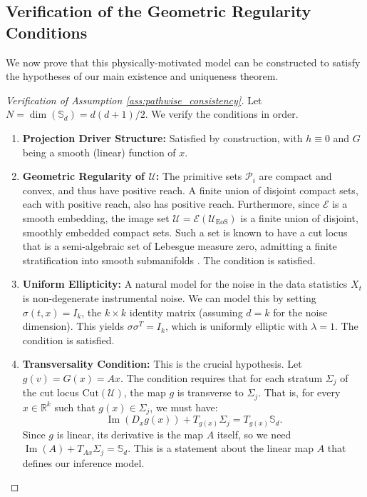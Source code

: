\documentclass[12pt, letterpaper]{amsart}
\newcommand{\Ucal}{\mathcal{U}}
\DeclareMathOperator{\Image}{Im}
\newcommand{\Sd}{\mathbb{S}_d}
\newcommand{\R}{\mathbb{R}}
\theoremstyle{plain}
\theoremstyle{definition}
\theoremstyle{remark}
\numberwithin{equation}{section} %
\begin{document}
\subsection{Verification of the Geometric Regularity Conditions}
We now prove that this physically-motivated model can be constructed to satisfy the hypotheses of our main existence and uniqueness theorem.

\begin{proof}[Verification of Assumption \ref{ass:pathwise_consistency}]
Let $N = \dim(\Sd) = d(d+1)/2$. We verify the conditions in order.
\begin{enumerate}[label=(\roman*)]
    \item \textbf{Projection Driver Structure:} Satisfied by construction, with $h \equiv 0$ and $G$ being a smooth (linear) function of $x$.

    \item \textbf{Geometric Regularity of $\Ucal$:} The primitive sets $\mathcal{P}_i$ are compact and convex, and thus have positive reach. A finite union of disjoint compact sets, each with positive reach, also has positive reach. Furthermore, since $\mathcal{E}$ is a smooth embedding, the image set \(\Ucal = \mathcal{E}(\Ucal_{\text{EoS}})\) is a finite union of disjoint, smoothly embedded compact sets. Such a set is known to have a cut locus that is a semi-algebraic set of Lebesgue measure zero, admitting a finite stratification into smooth submanifolds \cite{Federer1959}. The condition is satisfied.

    \item \textbf{Uniform Ellipticity:} A natural model for the noise in the data statistics $X_t$ is non-degenerate instrumental noise. We can model this by setting $\sigma(t,x) = I_k$, the $k \times k$ identity matrix (assuming $d=k$ for the noise dimension). This yields $\sigma\sigma^T = I_k$, which is uniformly elliptic with $\lambda=1$. The condition is satisfied.

    \item \textbf{Transversality Condition:} This is the crucial hypothesis. Let $g(v) = G(x) = Ax$. The condition requires that for each stratum $\Sigma_j$ of the cut locus $\mathrm{Cut}(\Ucal)$, the map $g$ is transverse to $\Sigma_j$. That is, for every $x \in \R^k$ such that $g(x) \in \Sigma_j$, we must have:
    \[ \Image(D_x g(x)) + T_{g(x)}\Sigma_j = T_{g(x)}\Sd. \]
    Since $g$ is linear, its derivative is the map $A$ itself, so we need $\Image(A) + T_{Ax}\Sigma_j = \Sd$. This is a statement about the linear map $A$ that defines our inference model.


\end{enumerate}
\end{proof}
\end{document}
